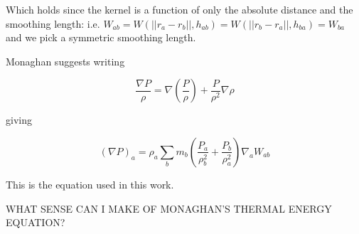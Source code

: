 \documentclass[../main.tex]{subfiles}
\begin{document}
Which holds since the kernel is a function of only the absolute distance and the smoothing length:
i.e. $W_{ab} = W(||r_a - r_b||, h_{ab}) = W(||r_b - r_a||, h_{ba}) = W_{ba}$ and we pick a symmetric
smoothing length.

Monaghan \autocite{monaghan1992} suggests writing

\begin{equation}
    \frac{\nabla P}{\rho} = \nabla (\frac{P}{\rho}) + \frac{P}{\rho^2} \nabla \rho
\end{equation}

giving

\begin{equation}
    (\nabla P)_a = \rho_a \sum_b m_b (\frac{P_a}{\rho_b^2} + \frac{P_b}{\rho_a^2}) \nabla_a W_{ab}
\end{equation}

This is the equation used in this work.

WHAT SENSE CAN I MAKE OF MONAGHAN'S THERMAL ENERGY EQUATION?
\end{document}
